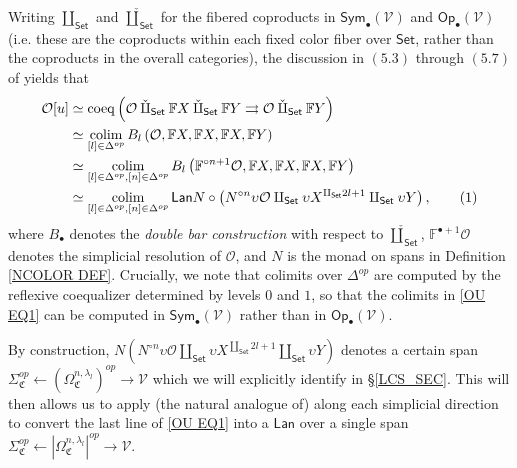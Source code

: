\documentclass[a4paper,10pt
,draft
]{article}%
\numberwithin{equation}{section}
\numberwithin{figure}{section}
\theoremstyle{definition} %
\DeclareMathOperator{\colim}{colim}%
\renewcommand{\O}{\ensuremath{\mathcal O}}
\newcommand{\1}{\ensuremath{\mathbbm 1}}%
\begin{document}
Writing $\amalg_{\mathsf{Set}}$ and $\mathbin{\check\amalg}_{\mathsf{Set}}$
for the fibered coproducts in 
$\mathsf{Sym}_{\bullet}(\mathcal{V})$ and
$\mathsf{Op}_{\bullet}(\mathcal{V})$
(i.e. these are the coproducts within each fixed color fiber over $\mathsf{Set}$, rather than the coproducts in the overall categories),
the discussion in $(5.3)$ through $(5.7)$ of \cite{BP_geo}
yields that
\begin{align*}
\O[u]
&
\simeq \mathrm{coeq}\left(
\O \mathbin{\check\amalg_{\mathsf{Set}}} \mathbb F X \mathbin{\check\amalg}_{\mathsf{Set}} \mathbb F Y \rightrightarrows \O \mathbin{\check\amalg}_{\mathsf{Set}} \mathbb F Y
\right)
\\
&
\simeq \colim_{[l] \in \Delta^{op}} 
B_l \left( \O, \mathbb F X, \mathbb F X, \mathbb F X, \mathbb FY \right)
\\
&
\simeq \colim_{[l] \in \Delta^{op},[n] \in \Delta^{op}} 
B_l \left( \mathbb F^{\circ n+1} \O, \mathbb F X, \mathbb F X, \mathbb F X, \mathbb FY \right)
\\
&
\simeq \colim_{[l] \in \Delta^{op},[n] \in \Delta^{op}} 
\mathsf{Lan} N \circ \left( N^{\circ n} \upsilon \O \amalg_{\mathsf{Set}} \upsilon X^{\amalg_{\mathsf{Set}} 2l +1} \amalg_{\mathsf{Set}} \upsilon Y \right),
\stepcounter{equation}\tag{\theequation}\label{OU EQ1}
\end{align*}
where $B_{\bullet}$ denotes the \textit{double bar construction}
with respect to $\mathbin{\check\amalg}_{\mathsf{Set}}$,
$\mathbb{F}^{\bullet +1} \mathcal{O}$ denotes the simplicial resolution of $\mathcal{O}$, 
and $N$ is the monad on spans in Definition \ref{NCOLOR DEF}.
Crucially, we note that colimits over $\Delta^{op}$
are computed by the reflexive coequalizer determined by levels $0$ and $1$, 
so that the colimits in \eqref{OU EQ1}
can be computed in $\mathsf{Sym}_{\bullet}(\mathcal{V})$
rather than in $\mathsf{Op}_{\bullet}(\mathcal{V})$.

By construction,
$N \left(N^{\circ n} \upsilon \O \amalg_{\mathsf{Set}} \upsilon X^{\amalg_{\mathsf{Set}} 2l +1}\amalg_{\mathsf{Set}} \upsilon Y \right)$
denotes a certain span
$\Sigma_{\mathfrak{C}}^{op} \leftarrow 
\left(\Omega^{n,\lambda_l}_{\mathfrak{C}}\right)^{op} \to \mathcal{V}$
which we will explicitly identify 
in \S \ref{LCS_SEC}.
This will then allows us to 
apply (the natural analogue of)
\cite[Prop. 5.42]{BP_geo}
along each simplicial direction
to convert the last line of \eqref{OU EQ1}
into a $\mathsf{Lan}$
over a single span
$\Sigma_{\mathfrak{C}}^{op} \leftarrow 
\left|\Omega^{n,\lambda_l}_{\mathfrak{C}}\right|^{op} \to \mathcal{V}$.
\end{document}
